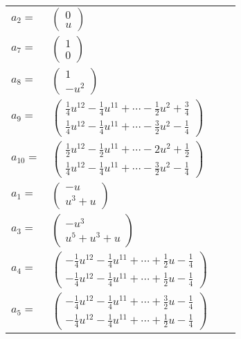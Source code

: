 \documentclass[1p]{elsarticle_modified}
\theoremstyle{definition}
\begin{document}
\begin{tabular}{m{7pt} m{180pt} m{7pt} m{180pt} }
\flushright $a_{2}=$&$\begin{pmatrix}0\\u\end{pmatrix}$ \\
\flushright $a_{7}=$&$\begin{pmatrix}1\\0\end{pmatrix}$ \\
\flushright $a_{8}=$&$\begin{pmatrix}1\\- u^2\end{pmatrix}$ \\
\flushright $a_{9}=$&$\begin{pmatrix}\frac{1}{4} u^{12}-\frac{1}{4} u^{11}+\cdots-\frac{1}{2} u^2+\frac{3}{4}\\\frac{1}{4} u^{12}-\frac{1}{4} u^{11}+\cdots-\frac{3}{2} u^2-\frac{1}{4}\end{pmatrix}$ \\
\flushright $a_{10}=$&$\begin{pmatrix}\frac{1}{2} u^{12}-\frac{1}{2} u^{11}+\cdots-2 u^2+\frac{1}{2}\\\frac{1}{4} u^{12}-\frac{1}{4} u^{11}+\cdots-\frac{3}{2} u^2-\frac{1}{4}\end{pmatrix}$ \\
\flushright $a_{1}=$&$\begin{pmatrix}- u\\u^3+u\end{pmatrix}$ \\
\flushright $a_{3}=$&$\begin{pmatrix}- u^3\\u^5+u^3+u\end{pmatrix}$ \\
\flushright $a_{4}=$&$\begin{pmatrix}-\frac{1}{4} u^{12}-\frac{1}{4} u^{11}+\cdots+\frac{1}{2} u-\frac{1}{4}\\-\frac{1}{4} u^{12}-\frac{1}{4} u^{11}+\cdots+\frac{1}{2} u-\frac{1}{4}\end{pmatrix}$ \\
\flushright $a_{5}=$&$\begin{pmatrix}-\frac{1}{4} u^{12}-\frac{1}{4} u^{11}+\cdots+\frac{3}{2} u-\frac{1}{4}\\-\frac{1}{4} u^{12}-\frac{1}{4} u^{11}+\cdots+\frac{1}{2} u-\frac{1}{4}\end{pmatrix}$ \\

\end{tabular}
\end{document}

